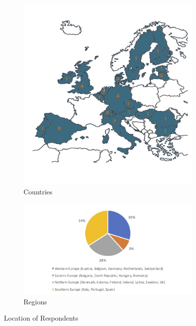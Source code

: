 \documentclass[11pt]{amsart}
\begin{document}
\begin{figure}[h]
\centering
\begin{subfigure}{.5\textwidth}
  \centering
  \includegraphics[width=\linewidth]{charts/map.jpg}
  \caption{Countries}
  \label{fig:map}
\end{subfigure}%
\begin{subfigure}{.5\textwidth}
  \centering
  \includegraphics[width=1.5\linewidth]{charts/regions.jpg}
  \caption{Regions}
  \label{fig:members}
\end{subfigure}
\caption{Location of Respondents}
\label{fig:mapandmembers}
\end{figure}
\end{document}
